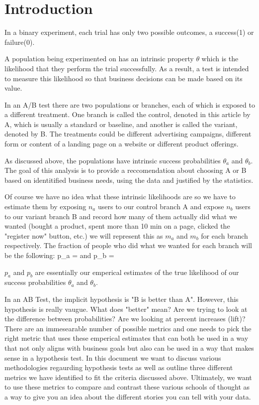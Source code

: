 
\section{Introduction\label{sec:Intro}}

In a binary experiment, each trial has only two possible outcomes, a success(1) or failure(0).

A population being experimented on has an intrinsic property $\theta$ which is the likelihood 
that they perform the trial successfully. As a result, a test is intended to measure this
likelihood so that business decisions can be made based on its value.

In an A/B test there are two populations or branches, each of which is exposed to a different 
treatment. One branch is called the control, denoted in this article by A, which is usually a standard or baseline, 
and another is called the variant, denoted by B. The treatments could be different advertising campaigns, 
different form or content of a landing page on a website or different product offerings.

As discussed above, the populations have intrinsic success probabilities $\theta_a$ and $\theta_b$. 
The goal of this analysis is to provide a reccomendation about choosing A or B based on identitified 
business needs, using the data and justified by the statistics. 

Of course we have no idea what these intrinsic likelihoods are so we have to estimate them by exposing $n_a$ users
to our control branch A and expose $n_b$ users to our variant branch B and record how many of them actually
did what we wanted (bought a product, spent more than 10 min on a page, clicked the "register now" button, etc.)
we will represent this as $m_a$ and $m_b$ for each branch respectively. The fraction of people who did what we wanted
for each branch will be the following: 
\beq
\label{pa}
p_a =  and  p_b = 
\eeq

$p_a$ and $p_b$ are essentially our emperical estimates of the true likelihood of our success probabilities $\theta_a$ and $\theta_b$. 

In an AB Test, the implicit hypothesis is "B is better than A". However, this hypothesis is really
vaugue. What does "better" mean? Are we trying to look at the difference between probabilities? Are we looking at percent increases (lift)? There are an immesearable number of possible metrics and one needs to pick the right metric that uses these emperical estimates that can both be used in a way that not only aligns with business goals but also can be used in a way that makes sense in a hypothesis test. In this document we want to discuss various methodologies regaurding
hypothesis tests as well as outline three different metrics we have identified to fit the criteria discussed above. Ultimately, we want to use these metrics to compare and contrast these various schools of thought as a way to give you an idea about the different stories you can tell with your data.

